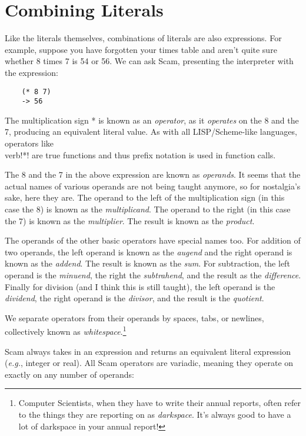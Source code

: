 \chapter{Combining Literals}
\label{CombiningLiterals}

Like the literals themselves, combinations of literals are also
expressions. For example, suppose you have forgotten your times table
and aren't quite sure whether 8 times 7 is 54 or 56. We can ask Scam,
presenting the interpreter with the expression:

\begin{verbatim}
    (* 8 7)
    -> 56
\end{verbatim}

The
multiplication sign * is known as an {\it operator}, as it {\it operates} on the 8
and the 7, producing an equivalent literal value.
As with all LISP/Scheme-like languages, operators like \\verb!*!
are true functions and thus prefix notation is used in function calls.

The 8 and the 7 in the above expression are
known as {\it operands}. It seems that the actual names of various operands are
not being taught anymore, so for nostalgia's sake, here they are. The
operand to the left of the multiplication sign (in this case the 8) is
known as the {\it multiplicand}. The operand to the right (in this case the 7)
is known as the {\it multiplier}. The result is known as the {\it product}.

The operands of the other basic operators
have special names too. For addition of two operands, the left operand is known as the
{\it augend} and the right operand is known as the {\it addend}.
The result is known as the {\it sum}.
For subtraction,
the left operand is the {\it minuend}, the right the {\it subtrahend}, and
the result as the {\it difference}.
Finally
for division (and I think this is still taught), the left operand is
the {\it dividend}, the right operand is the {\it divisor}, and the 
result is the {\it quotient}.

We separate
operators from their operands by
spaces, tabs,
or newlines, collectively known as {\it whitespace}.\footnote{
Computer Scientists, when they have to write their annual reports,
often refer to the things they are reporting on as
{\it darkspace}. It's always good to have a lot of darkspace in
your annual report!
}

Scam always takes in an expression and returns an equivalent
literal expression ({\it e.g.}, integer or real). All Scam operators are
variadic, meaning they operate on exactly on any number of operands:

